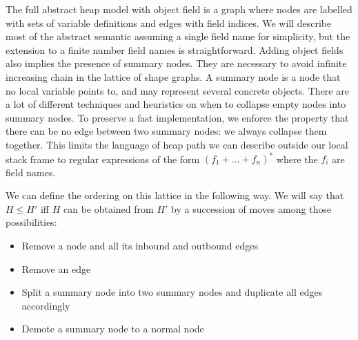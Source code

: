 \documentclass[11pt]{article}
\begin{document}
The full abstract heap model with object field is a graph where nodes are labelled with sets of variable definitions and edges with field indices.
We will describe most of the abstract semantic assuming a single field name for simplicity, but the extension to a finite number field names is straightforward.
Adding object fields also implies the presence of summary nodes. They are necessary to avoid infinite increasing chain in the lattice of shape graphs.
A summary node is a node that no local variable points to, and may represent several concrete objects.
There are a lot of different techniques and heuristics on when to collapse empty nodes into summary nodes.
To preserve a fast implementation, we enforce the property that there can be no edge between two summary nodes: we always collapse them together.
This limits the language of heap path we can describe outside our local stack frame to regular expressions of the form $(f_1+\dots+f_n)^*$ where the $f_i$ are field names.

We can define the ordering on this lattice in the following way.
We will say that $H\leq H'$ iff $H$ can be obtained from $H'$ by a succession of moves among those possibilities:
\begin{itemize}
\item Remove a node and all its inbound and outbound edges
\item Remove an edge
\item Split a summary node into two summary nodes and duplicate all edges accordingly
\item Demote a summary node to a normal node
\end{itemize}
\end{document}
